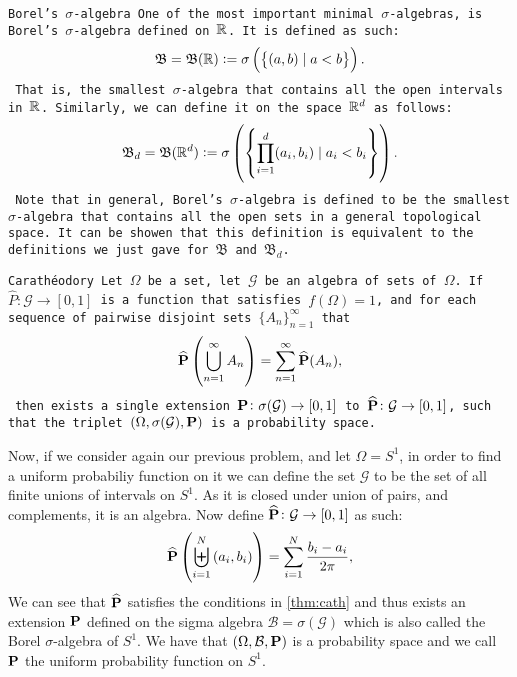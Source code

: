 \documentclass[11pt,a4paper]{article}
\begin{document}
  \begin{example}
    \tt{Borel's $\sigma$-algebra}
    One of the most important minimal $\sigma$-algebras, is Borel's 
    $\sigma$-algebra defined on $\mathbb{R}$. It is defined as such:
    \[
      \mathfrak B =
      \mathfrak B(\mathbb{R}) :=
      \sigma\left(\set{(a,b) \mid a < b}\right).
    \]
    That is, the smallest $\sigma$-algebra that contains all the open 
    intervals in $\mathbb{R}$. Similarly, we can define it on the space $\mathbb{R}^d$
    as follows:
    \[
      \mathfrak B_d =
      \mathfrak B(\mathbb{R}^d) :=
      \sigma\left(\set{\prod_{i=1}^{d}(a_i,b_i) \mid a_i < b_i}\right).
    \]
    Note that in general, Borel's $\sigma$-algebra is defined to be
    the smallest $\sigma$-algebra that contains all the open sets in a
    general topological space. It can be showen that this definition is
    equivalent to the definitions we just gave for $\mathfrak B$ and
    $\mathfrak B_d$.
  \end{example}

  \begin{theorem}\label{thm:cath}
    \tt{Carath\'eodory}
    Let $\Omega$ be a set, let $\mathcal G$ be an algebra of sets of $\Omega$.
    If $\widehat{P} \colon \mathcal G \to [0,1]$ is a function that satisfies
    $f(\Omega) = 1$, and for each sequence of pairwise disjoint sets
    $\{A_n\}_{n=1}^{\infty}$ that
      \[
        \widehat{\mathbf{P}} \left(\bigcup_{n=1}^{\infty}{A_n}\right) = 
        \sum_{n=1}^{\infty}{\widehat{\mathbf{P}}(A_n)},
      \]
    then exists a single extension 
    $\mathbf{P} \colon \sigma(\mathcal G) \to [0,1]$ to 
    $\widehat{\mathbf{P}} \colon \mathcal G \to [0,1]$, such that the triplet
    $(\Omega, \sigma(\mathcal G), \mathbf{P})$ is a probability space.
  \end{theorem}

  Now, if we consider again our previous problem, and let $\Omega = S^1$,
  in order to find a uniform probabiliy function on it we can define the
  set $\mathcal G$ to be the set of all finite unions of intervals on $S^1$.
  As it is closed under union of pairs, and complements, it is an algebra.
  Now define $\widehat{\mathbf{P}} \colon \mathcal G \to [0,1]$ as such:
  \[
    \widehat{\mathbf{P}}\left(\biguplus_{i=1}^{N}\left(a_{i},b_{i}\right)\right)
    = \sum_{i=1}^{N}\frac{b_{i}-a_{i}}{2\pi},
  \]
  We can see that $\widehat{\mathbf{P}}$ satisfies the conditions in 
  \autoref{thm:cath} and thus exists an extension $\mathbf{P}$ defined on
  the sigma algebra $\mathcal B = \sigma(\mathcal G)$ which is also called
  the Borel $\sigma$-algebra of $S^1$. We have that 
  $(\Omega, \mathcal B, \mathbf{P})$ is a probability space and we call 
  $\mathbf{P}$ the uniform probability function on $S^1$.
\end{document}
